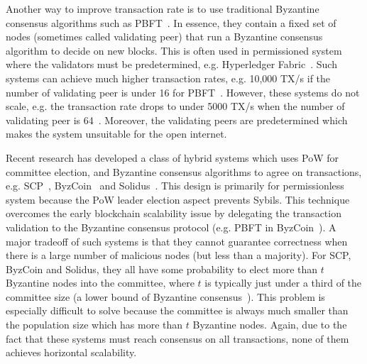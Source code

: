Another way to improve transaction rate is to use traditional Byzantine consensus algorithms such as PBFT~\cite{castro1999practical}.
In essence, they contain a fixed set of nodes (sometimes called validating peer) that run a Byzantine consensus algorithm to decide on new blocks.
This is often used in permissioned system where the validators must be predetermined, e.g. Hyperledger Fabric~\cite{cachin2016architecture}.
Such systems can achieve much higher transaction rates, e.g. 10,000 TX/s if the number of validating peer is under 16 for PBFT~\cite[Section 5.2]{miller2016honey}.
However, these systems do not scale, e.g. the transaction rate drops to under 5000 TX/s when the number of validating peer is 64~\cite[Section 5.2]{miller2016honey}.
Moreover, the validating peers are predetermined which makes the system unsuitable for the open internet.

Recent research has developed a class of hybrid systems which uses PoW for committee election,
and Byzantine consensus algorithms to agree on transactions, e.g. SCP~\cite{luu2015scp}, ByzCoin~\cite{kogias2016enhancing} and Solidus~\cite{abraham2016solidus}.
This design is primarily for permissionless system because the PoW leader election aspect prevents Sybils.
This technique overcomes the early blockchain scalability issue by delegating the transaction validation to the Byzantine consensus protocol (e.g. PBFT in ByzCoin~\cite{kogias2016enhancing}).
A major tradeoff of such systems is that they cannot guarantee correctness when there is a large number of malicious nodes (but less than a majority).
For SCP, ByzCoin and Solidus, they all have some probability to elect more than $t$ Byzantine nodes into the committee,
where $t$ is typically just under a third of the committee size (a lower bound of Byzantine consensus~\cite{pease1980reaching}).
This problem is especially difficult to solve because the committee is always much smaller than the population size which has more than $t$ Byzantine nodes.
Again, due to the fact that these systems must reach consensus on all transactions,
none of them achieves horizontal scalability.

